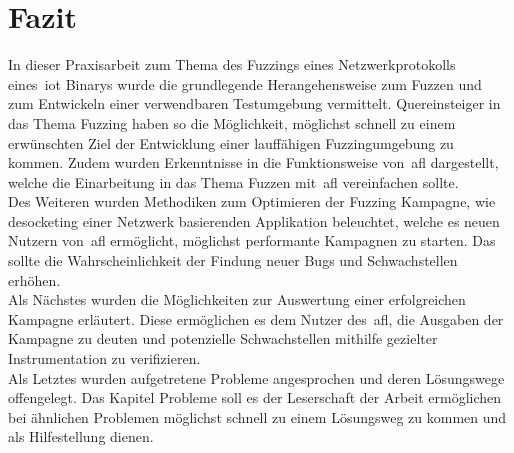 \section{Fazit}\label{sec:fazit}
In dieser Praxisarbeit zum Thema des Fuzzings eines Netzwerkprotokolls eines~\gls{iot} Binarys wurde die grundlegende
Herangehensweise zum Fuzzen und zum Entwickeln einer verwendbaren Testumgebung vermittelt.
Quereinsteiger in das Thema Fuzzing haben so die Möglichkeit, möglichst schnell zu einem erwünschten Ziel der Entwicklung einer
lauffähigen Fuzzingumgebung zu kommen.
Zudem wurden Erkenntnisse in die Funktionsweise von~\gls{afl} dargestellt, welche die Einarbeitung in das Thema Fuzzen
mit~\gls{afl} vereinfachen sollte.\\
Des Weiteren wurden Methodiken zum Optimieren der Fuzzing Kampagne, wie desocketing einer Netzwerk basierenden Applikation beleuchtet,
welche es neuen Nutzern von~\gls{afl} ermöglicht, möglichst performante Kampagnen zu starten.
Das sollte die Wahrscheinlichkeit der Findung neuer Bugs und Schwachstellen erhöhen. \\
Als Nächstes wurden die Möglichkeiten zur Auswertung einer erfolgreichen Kampagne erläutert.
Diese ermöglichen es dem Nutzer des~\gls{afl}, die Ausgaben der Kampagne zu deuten und potenzielle Schwachstellen
mithilfe gezielter Instrumentation zu verifizieren.\\
Als Letztes wurden aufgetretene Probleme angesprochen und deren Lösungswege offengelegt.
Das Kapitel Probleme soll es der Leserschaft der Arbeit ermöglichen bei ähnlichen Problemen möglichst schnell
zu einem Lösungsweg zu kommen und als Hilfestellung dienen.
